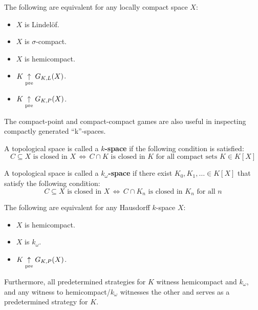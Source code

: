 \begin{cor}
The following are equivalent for any locally compact space $X$:
  \begin{itemize}
  \item $X$ is Lindel\"of.
  \item $X$ is $\sigma$-compact.
  \item $X$ is hemicompact.
  \item $K \underset{\text{pre}}{\uparrow} G_{K,L}(X)$.
  \item $K \underset{\text{pre}}{\uparrow} G_{K,P}(X)$.
  \end{itemize}
\end{cor}

The compact-point and compact-compact games are also useful in inspecting compactly generated ``k''-spaces.

\begin{defn}
A topological space is called a \textbf{$k$-space} if the following condition is satisfied: \[C \subseteq X \text{ is closed in } X\, \Leftrightarrow \, C\cap K \text{ is closed in } K \text{ for all compact sets } K\in K[X]\]
\end{defn}

\begin{defn}
A topological space is called a \textbf{$k_\omega$-space} if there exist $K_0,K_1,\dots \in K[X]$ that satisfy the following condition: \[C \subseteq X \text{ is closed in } X\, \Leftrightarrow \, C \cap K_n \text{ is closed in } K_n \text{ for all } n\]
\end{defn}

\begin{thm}
The following are equivalent for any Hausdorff $k$-space $X$:
  \begin{itemize}
  \item $X$ is hemicompact.
  \item $X$ is $k_{\omega}$.
  \item $K \underset{\text{pre}}{\uparrow} G_{K,P}(X)$.
  \end{itemize}
Furthermore, all predetermined strategies for $K$ witness hemicompact and $k_\omega$, and any witness to hemicompact/$k_\omega$ witnesses the other and serves as a predetermined strategy for $K$.
\end{thm}

